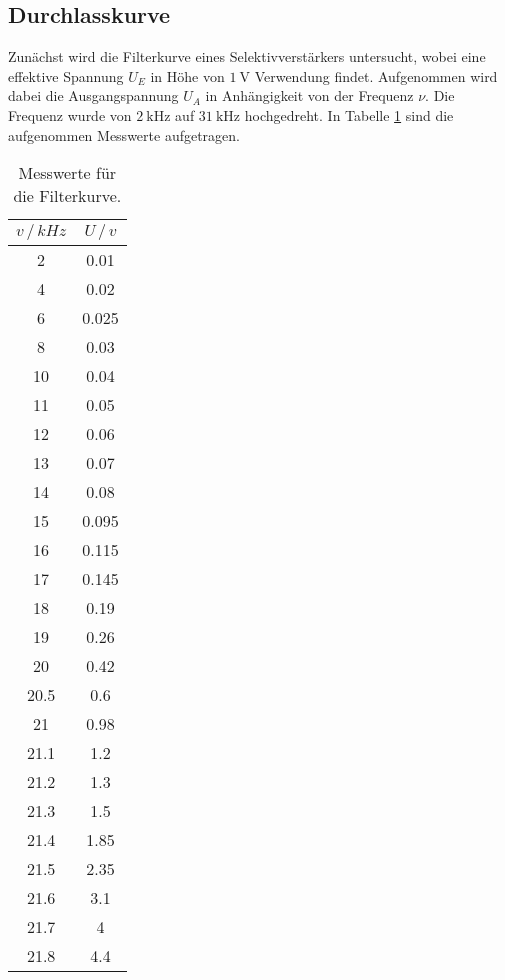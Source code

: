 \subsection{Durchlasskurve}
\label{sec:Durchlasskurve}

Zunächst wird die Filterkurve eines Selektivverstärkers untersucht, wobei eine effektive Spannung $U_E$ in Höhe von $ \SI{1}{\volt}$ 
Verwendung findet. Aufgenommen wird dabei die Ausgangspannung $U_A$ in Anhängigkeit von der Frequenz $\nu$. Die Frequenz wurde von
$\SI{2}{\kHz}$ auf $\SI{31}{\kHz}$ hochgedreht. In Tabelle \ref{tab:filterkurve} sind die aufgenommen Messwerte aufgetragen.

\begin{table}[H]
    \centering
    \caption{Messwerte für die Filterkurve.}
    \label{tab:filterkurve}
\begin{tabular}{c c}
    \toprule
          $v \, /\,\si{kHz}$ & $U \,/\,\si{v}$ \\
    \midrule
           2 &    0.01 \\
           4 &    0.02 \\
           6 &   0.025 \\
           8 &    0.03 \\
          10 &    0.04 \\
          11 &    0.05 \\
          12 &    0.06 \\
          13 &    0.07 \\
          14 &    0.08 \\
          15 &   0.095 \\
          16 &   0.115 \\
          17 &   0.145 \\
          18 &    0.19 \\
          19 &    0.26 \\
          20 &    0.42 \\
        20.5 &     0.6 \\
          21 &    0.98 \\
        21.1 &     1.2 \\
        21.2 &     1.3 \\
        21.3 &     1.5 \\
        21.4 &    1.85 \\
        21.5 &    2.35 \\
        21.6 &     3.1 \\
        21.7 &       4 \\
        21.8 &     4.4 \\

\end{tabular}
\end{table}
